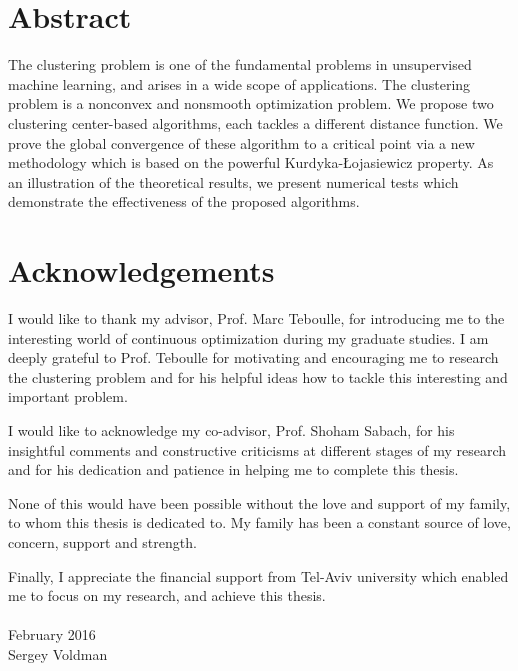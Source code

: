 \setcounter{page}{3}
\chapter*{Abstract}

The clustering problem is one of the fundamental problems in unsupervised machine learning, and arises in a wide scope of applications. The clustering problem is a nonconvex and nonsmooth optimization problem. We propose two clustering center-based algorithms, each tackles a different distance function. We prove the global convergence of these algorithm to a critical point via a new methodology which is based on the powerful Kurdyka-{\L}ojasiewicz property. As an illustration of the theoretical results, we present numerical tests which demonstrate the effectiveness of the proposed algorithms.



\chapter*{Acknowledgements}

I would like to thank my advisor, Prof. Marc Teboulle, for introducing me to the interesting world of continuous optimization during my graduate studies. I am deeply grateful to Prof. Teboulle for motivating and encouraging me to research the clustering problem and for his helpful ideas how to tackle this interesting and important problem.

I would like to acknowledge my co-advisor, Prof. Shoham Sabach, for his insightful comments and constructive criticisms at different stages of my research and for his dedication and patience in helping me to complete this thesis.

None of this would have been possible without the love and support of my family, to whom this thesis is dedicated to. My family has been a constant source of love, concern, support and strength.

Finally, I appreciate the financial support from Tel-Aviv university which enabled me to focus on my research, and achieve this thesis.
\\
\\
\noindent February 2016\\
\noindent Sergey Voldman



\nobreak
